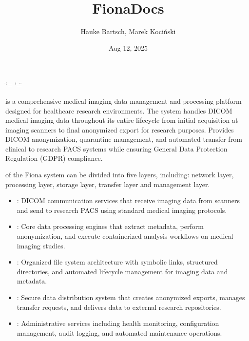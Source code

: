 \documentclass[letterpaper,10pt,english]{sphinxmanual}
\title{FionaDocs}
\date{Aug 12, 2025}
\author{Hauke Bartsch, Marek Kociński}
\begin{document}
\ifdefined\shorthandoff
  \ifnum\catcode`\=\string=\active\shorthandoff{=}\fi
  \ifnum\catcode`\"=\active{}\fi
\fi

\pagestyle{empty}
\sphinxmaketitle
\pagestyle{plain}
\sphinxtableofcontents
\pagestyle{normal}
\label{\detokenize{index::doc}}


\sphinxAtStartPar
{} is a comprehensive medical imaging data management and processing platform designed for healthcare research environments. The system handles DICOM medical imaging data throughout its entire lifecycle \sphinxhyphen{} from initial acquisition at imaging scanners to final anonymized export for research purposes. Provides DICOM anonymization, quarantine management, and automated transfer from clinical to research PACS systems while ensuring General Data Protection Regulation (GDPR) compliance.

\sphinxAtStartPar
{} of the Fiona system can be divided into five layers, including: network layer, processing layer, storage layer, transfer layer and management layer.

\begin{itemize}
\item {} 
\sphinxAtStartPar
{}: DICOM communication services that receive imaging data from scanners and send to research PACS using standard medical imaging protocols.

\item {} 
\sphinxAtStartPar
{}: Core data processing engines that extract metadata, perform anonymization, and execute containerized analysis workflows on medical imaging studies.

\item {} 
\sphinxAtStartPar
{}: Organized file system architecture with symbolic links, structured directories, and automated lifecycle management for imaging data and metadata.

\item {} 
\sphinxAtStartPar
{}: Secure data distribution system that creates anonymized exports, manages transfer requests, and delivers data to external research repositories.

\item {} 
\sphinxAtStartPar
{}: Administrative services including health monitoring, configuration management, audit logging, and automated maintenance operations.

\end{itemize}
\end{document}
